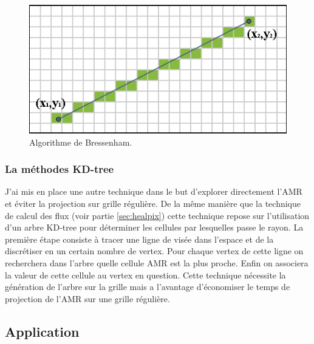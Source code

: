 \begin{figure}
        \includegraphics[width=.95\linewidth]{img/04/Bresenham_line.png} 
        \caption[Algorithme de Bressenham]{Algorithme de Bressenham.}
 		\label{fig:bressenham}
\end{figure}

\subsubsection{La méthodes KD-tree}

J'ai mis en place une autre technique dans le but d'explorer directement l'\ac{AMR} et éviter la projection sur grille régulière.
De la même manière que la technique de calcul des flux (voir partie \ref{sec:healpix}) cette technique repose sur l'utilisation d'un arbre KD-tree pour déterminer les cellules par lesquelles passe le rayon.
La première étape consiste à tracer une ligne de visée dans l'espace et de la discrétiser en un certain nombre de vertex.
Pour chaque vertex de cette ligne on recherchera dans l'arbre quelle cellule \ac{AMR} est la plus proche.
Enfin on associera la valeur de cette cellule au vertex en question.
Cette technique nécessite la génération de l'arbre sur la grille mais a l'avantage d'économiser le temps de projection de l'\ac{AMR} sur une grille régulière.

\subsection{Application}


